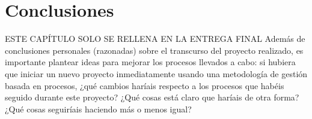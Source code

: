 
\chapter{Conclusiones} %

\label{Chapter6} %



ESTE CAPÍTULO SOLO SE RELLENA EN LA ENTREGA FINAL
Además de conclusiones personales (razonadas) sobre el transcurso del proyecto realizado, es importante plantear ideas para mejorar los procesos llevados a cabo: si hubiera que iniciar un nuevo proyecto inmediatamente usando una metodología de gestión basada en procesos, ¿qué cambios haríais respecto a los procesos que habéis seguido durante este proyecto?  ¿Qué cosas está claro que haríais de otra forma? ¿Qué cosas seguiríais haciendo más o menos igual?
